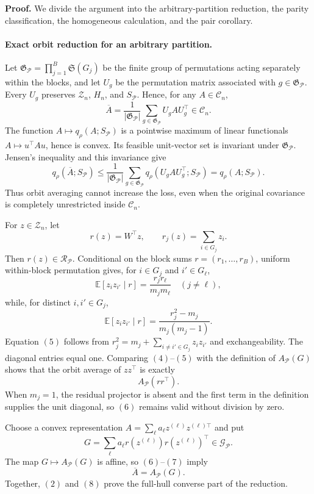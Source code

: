 \textbf{Proof.}
We divide the argument into the arbitrary-partition reduction, the parity classification, the homogeneous calculation, and the pair corollary.

\paragraph{Exact orbit reduction for an arbitrary partition.}
Let \(\mathfrak G_{\mathcal P}=\prod_{j=1}^B\mathfrak S(G_j)\) be the finite group of permutations acting separately within the blocks, and let \(U_g\) be the permutation matrix associated with \(g\in\mathfrak G_{\mathcal P}\).  Every \(U_g\) preserves \(\mathcal Z_n\), \(H_n\), and \(S_{\mathcal P}\).  Hence, for any \(A\in\mathcal C_n\),
\[
\overline A
=\frac1{|\mathfrak G_{\mathcal P}|}
\sum_{g\in\mathfrak G_{\mathcal P}}U_gAU_g^\top
\in\mathcal C_n.
\tag{1}
\]
The function \(A\mapsto q_\rho(A;S_{\mathcal P})\) is a pointwise maximum of linear functionals \(A\mapsto u^\top Au\), hence is convex.  Its feasible unit-vector set is invariant under \(\mathfrak G_{\mathcal P}\).  Jensen's inequality and this invariance give
\[
q_\rho(\overline A;S_{\mathcal P})
\leq \frac1{|\mathfrak G_{\mathcal P}|}
\sum_{g\in\mathfrak G_{\mathcal P}}
q_\rho(U_gAU_g^\top;S_{\mathcal P})
=q_\rho(A;S_{\mathcal P}).
\tag{2}
\]
Thus orbit averaging cannot increase the loss, even when the original covariance is completely unrestricted inside \(\mathcal C_n\).

For \(z\in\mathcal Z_n\), let
\[
r(z)=W^\top z,
\qquad
r_j(z)=\sum_{i\in G_j}z_i.
\tag{3}
\]
Then \(r(z)\in\mathcal R_{\mathcal P}\).  Conditional on the block sums \(r=(r_1,\ldots,r_B)\), uniform within-block permutation gives, for \(i\in G_j\) and \(i'\in G_\ell\),
\[
\mathbb E[z_i z_{i'}\mid r]
=\frac{r_jr_\ell}{m_jm_\ell}
\quad(j\ne\ell),
\tag{4}
\]
while, for distinct \(i,i'\in G_j\),
\[
\mathbb E[z_i z_{i'}\mid r]
=\frac{r_j^2-m_j}{m_j(m_j-1)}.
\tag{5}
\]
Equation \((5)\) follows from
\(r_j^2=m_j+\sum_{i\ne i'\in G_j}z_i z_{i'}\) and exchangeability.  The diagonal entries equal one.  Comparing \((4)\)--\((5)\) with the definition of \(A_{\mathcal P}(G)\) shows that the orbit average of \(zz^\top\) is exactly
\[
A_{\mathcal P}(rr^\top).
\tag{6}
\]
When \(m_j=1\), the residual projector is absent and the first term in the definition supplies the unit diagonal, so \((6)\) remains valid without division by zero.

Choose a convex representation \(A=\sum_\ell a_\ell z^{(\ell)}z^{(\ell)\top}\) and put
\[
G=\sum_\ell a_\ell r(z^{(\ell)})r(z^{(\ell)})^\top
\in\mathcal G_{\mathcal P}.
\tag{7}
\]
The map \(G\mapsto A_{\mathcal P}(G)\) is affine, so \((6)\)--\((7)\) imply
\[
\overline A=A_{\mathcal P}(G).
\tag{8}
\]
Together, \((2)\) and \((8)\) prove the full-hull converse part of the reduction.

